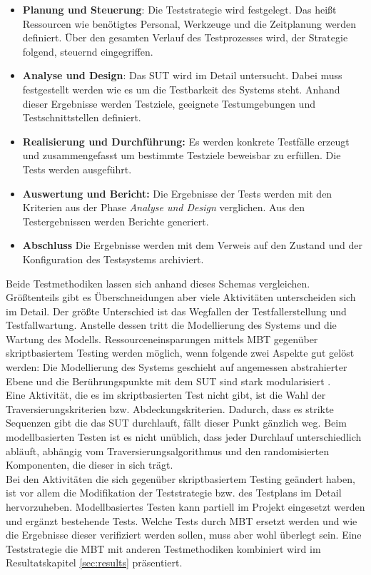 \begin{itemize}
\item \textbf{Planung und Steuerung}: Die Teststrategie wird festgelegt. Das heißt Ressourcen wie benötigtes Personal, Werkzeuge und die Zeitplanung werden definiert. Über den gesamten Verlauf des Testprozesses wird, der Strategie folgend, steuernd eingegriffen.
\item \textbf{Analyse und Design}: Das \Gls{SUT} wird im Detail untersucht. Dabei muss festgestellt werden wie es um die Testbarkeit des Systems steht. Anhand dieser Ergebnisse werden Testziele, geeignete Testumgebungen und Testschnittstellen definiert.
\item \textbf{Realisierung und Durchführung:} Es werden konkrete Testfälle erzeugt und zusammengefasst um bestimmte Testziele beweisbar zu erfüllen. Die Tests werden ausgeführt.
\item \textbf{Auswertung und Bericht:} Die Ergebnisse der Tests werden mit den Kriterien aus der Phase \textit{Analyse und Design} verglichen. Aus den Testergebnissen werden Berichte generiert.
\item \textbf{Abschluss} Die Ergebnisse werden mit dem Verweis auf den Zustand und der Konfiguration des Testsystems archiviert.
\end{itemize}


Beide Testmethodiken lassen sich anhand dieses Schemas vergleichen. Größtenteils gibt es Überschneidungen aber viele Aktivitäten unterscheiden sich im Detail. Der größte Unterschied ist das Wegfallen der Testfallerstellung und Testfallwartung. Anstelle dessen tritt die Modellierung des Systems und die Wartung des Modells. Ressourceneinsparungen mittels \Gls{MBT} gegenüber skriptbasiertem Testing werden möglich, wenn folgende zwei Aspekte gut gelöst werden: Die Modellierung des Systems geschieht auf angemessen abstrahierter Ebene und die Berührungspunkte mit dem \Gls{SUT} sind stark modularisiert \cite{utting_practical_2007}.\\
Eine Aktivität, die es im skriptbasierten Test nicht gibt, ist die Wahl der Traversierungskriterien bzw. Abdeckungskriterien. Dadurch, dass es strikte Sequenzen gibt die das \Gls{SUT} durchlauft, fällt dieser Punkt gänzlich weg. Beim modellbasierten Testen ist es nicht unüblich, dass jeder Durchlauf unterschiedlich abläuft, abhängig vom Traversierungsalgorithmus und den randomisierten Komponenten, die dieser in sich trägt.\\
Bei den Aktivitäten die sich gegenüber skriptbasiertem Testing geändert haben, ist vor allem die Modifikation der Teststrategie bzw. des Testplans im Detail hervorzuheben. Modellbasiertes Testen kann partiell im Projekt eingesetzt werden und ergänzt bestehende Tests. Welche Tests durch \Gls{MBT} ersetzt werden und wie die Ergebnisse dieser verifiziert werden sollen, muss aber wohl überlegt sein. Eine Teststrategie die \Gls{MBT} mit anderen Testmethodiken kombiniert wird im Resultatskapitel \ref{sec:results} präsentiert.

